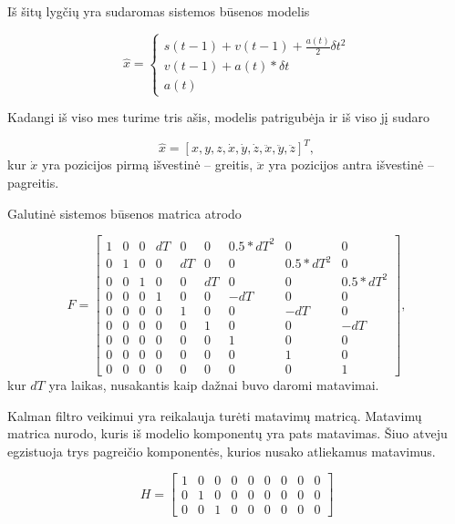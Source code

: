 Iš šitų lygčių yra sudaromas sistemos būsenos modelis

\begin{equation}
    \hat{x} = \begin{cases}
        s(t-1) + v(t-1) + \frac{a(t)}{2}\delta t^2 \\
        v(t-1) + a(t) * \delta t \\
        a(t)
    \end{cases}
\end{equation}

Kadangi iš viso mes turime tris ašis, modelis patrigubėja ir iš viso jį sudaro

\begin{equation}
    \hat{x} = [ x, y, z, \dot{x}, \dot{y}, \dot{z}, \ddot{x}, \ddot{y}, \ddot{z}]^T,
\end{equation}
kur $\dot{x}$ yra pozicijos pirmą išvestinė -- greitis, $\ddot{x}$ yra pozicijos antra išvestinė -- pagreitis.

Galutinė sistemos būsenos matrica atrodo

\begin{equation}
    F = \begin{bmatrix}
        1 & 0 & 0 & dT & 0 & 0 & 0.5*dT^2 & 0 & 0 \\
        0 & 1 & 0 & 0 & dT & 0 & 0 & 0.5*dT^2 & 0 \\
        0 & 0 & 1 & 0 & 0 & dT & 0 & 0 & 0.5*dT^2 \\
        0 & 0 & 0 & 1 & 0 & 0 & -dT & 0 & 0 \\
        0 & 0 & 0 & 0 & 1 & 0 & 0 & -dT & 0 \\
        0 & 0 & 0 & 0 & 0 & 1 & 0 & 0 & -dT \\
        0 & 0 & 0 & 0 & 0 & 0 & 1 & 0 & 0 \\
        0 & 0 & 0 & 0 & 0 & 0 & 0 & 1 & 0 \\
        0 & 0 & 0 & 0 & 0 & 0 & 0 & 0 & 1
    \end{bmatrix},
\end{equation}
kur $dT$ yra laikas, nusakantis kaip dažnai buvo daromi matavimai.

Kalman filtro veikimui yra reikalauja turėti matavimų matricą.
Matavimų matrica nurodo, kuris iš modelio komponentų yra pats matavimas.
Šiuo atveju egzistuoja trys pagreičio komponentės, kurios nusako atliekamus matavimus.

\begin{equation}
    H = \begin{bmatrix}
        1 & 0 & 0 & 0 & 0 & 0 & 0 & 0 & 0 \\
        0 & 1 & 0 & 0 & 0 & 0 & 0 & 0 & 0 \\
        0 & 0 & 1 & 0 & 0 & 0 & 0 & 0 & 0
    \end{bmatrix}
\end{equation}

